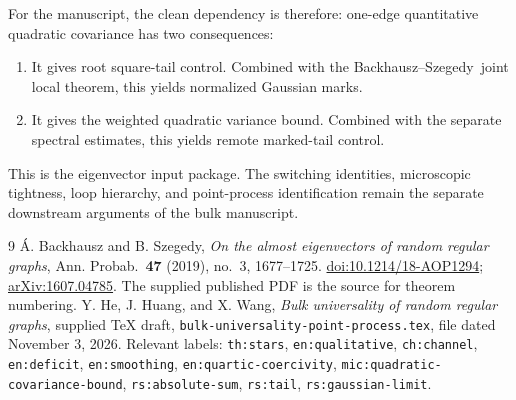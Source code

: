 \documentclass[11pt]{article}
\numberwithin{equation}{section}
\theoremstyle{definition}
\theoremstyle{remark}
\newcommand{\BS}{Backhausz--Szegedy}
\begin{document}
For the manuscript, the clean dependency is therefore:
one-edge quantitative quadratic covariance has two consequences:
\begin{enumerate}
\item It gives root square-tail control. Combined with the \BS\ joint
local theorem, this yields normalized Gaussian marks.
\item It gives the weighted quadratic variance bound. Combined with the
separate spectral estimates, this yields remote marked-tail control.
\end{enumerate}
This is the eigenvector input package. The switching identities,
microscopic tightness, loop hierarchy, and point-process identification
remain the separate downstream arguments of the bulk manuscript.

\begin{thebibliography}{9}
\'A. Backhausz and B. Szegedy,
\emph{On the almost eigenvectors of random regular graphs},
Ann. Probab.\ \textbf{47} (2019), no.\ 3, 1677--1725.
\href{https://doi.org/10.1214/18-AOP1294}{doi:10.1214/18-AOP1294};
\href{https://arxiv.org/abs/1607.04785}{arXiv:1607.04785}.
The supplied published PDF is the source for theorem numbering.
Y. He, J. Huang, and X. Wang,
\emph{Bulk universality of random regular graphs}, supplied TeX draft,
\texttt{bulk-universality-point-process.tex}, file dated November 3, 2026.
Relevant labels: \texttt{th:stars}, \texttt{en:qualitative},
\texttt{ch:channel}, \texttt{en:deficit}, \texttt{en:smoothing},
\texttt{en:quartic-coercivity}, \texttt{mic:quadratic-covariance-bound},
\texttt{rs:absolute-sum}, \texttt{rs:tail}, \texttt{rs:gaussian-limit}.
\end{thebibliography}
\end{document}

